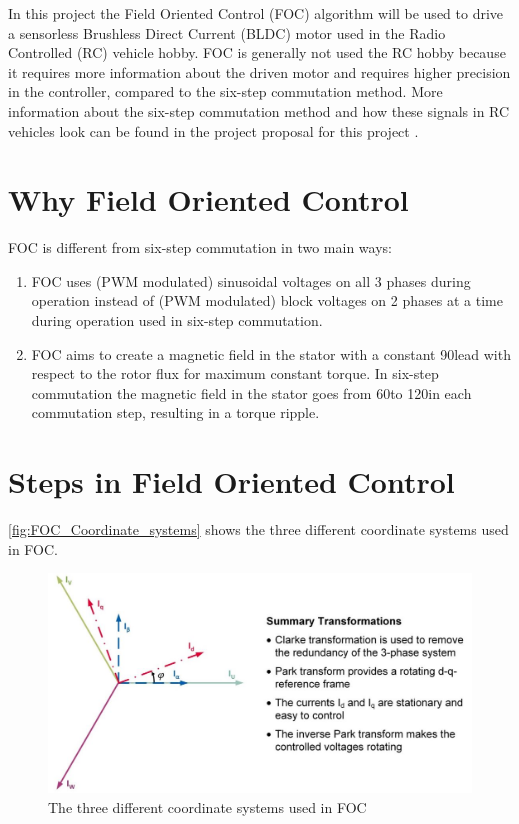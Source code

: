 \documentclass[]{report}
\begin{document}
In this project the Field Oriented Control (FOC) algorithm will be used to drive a sensorless Brushless Direct Current (BLDC) motor used in the Radio Controlled (RC) vehicle hobby. FOC is generally not used the RC hobby because it requires more information about the driven motor and requires higher precision in the controller, compared to the six-step commutation method. More information about the six-step commutation method and how these signals in RC vehicles look can be found in the project proposal for this project \cite{Project_Proposal_EnzoEvers_FOC_BLDC}.

\section{Why Field Oriented Control}
FOC is different from six-step commutation in two main ways:
\begin{enumerate}
	\item FOC uses (PWM modulated) sinusoidal voltages on all 3 phases during operation instead of (PWM modulated) block voltages on 2 phases at a time during operation used in six-step commutation.
	\item FOC aims to create a magnetic field in the stator with a constant 90\degree lead with respect to the rotor flux for maximum constant torque. In six-step commutation the magnetic field in the stator goes from 60\degree to 120\degree in each commutation step, resulting in a torque ripple.
\end{enumerate}

\section{Steps in Field Oriented Control}

\autoref{fig:FOC_Coordinate_systems} shows the three different coordinate systems used in FOC.

\begin{figure}[H]
	\centering
	\includegraphics[width=\textwidth]{CoordinateSystems.JPG}
	\caption{The three different coordinate systems used in FOC \cite{Infineon_sensorless_FOC}}
	\label{fig:FOC_Coordinate_systems}
\end{figure}
\end{document}
